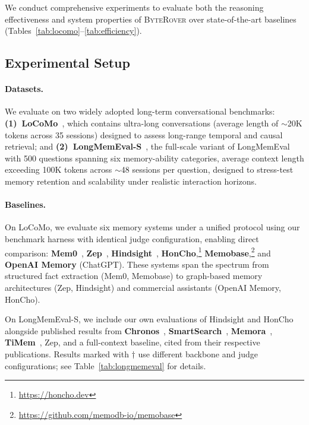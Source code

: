 \documentclass[11pt]{article}
\newcommand{\byterover}{\textsc{ByteRover}}
\begin{document}
We conduct comprehensive experiments to evaluate both the reasoning effectiveness
and system properties of \byterover{} over state-of-the-art baselines
(Tables~\ref{tab:locomo}--\ref{tab:efficiency}).

\subsection{Experimental Setup}
\label{sec:exp-setup}

\paragraph{Datasets.}
We evaluate on two widely adopted long-term conversational benchmarks:
\textbf{(1)~LoCoMo}~\citep{maharana2024locomo},
which contains ultra-long conversations (average length of $\sim$20K tokens across 35 sessions)
designed to assess long-range temporal and causal retrieval;
and \textbf{(2)~LongMemEval-S}~\citep{wu2024longmemeval},
the full-scale variant of LongMemEval with 500 questions spanning six memory-ability categories,
average context length exceeding 100K tokens across ${\sim}$48 sessions per question,
designed to stress-test memory retention and scalability under realistic interaction horizons.

\paragraph{Baselines.}
On LoCoMo, we evaluate six memory systems under a unified protocol
using our benchmark harness with identical judge configuration,
enabling direct comparison:
\textbf{Mem0}~\citep{chhikara2025mem0},
\textbf{Zep}~\citep{rasmussen2025zep},
\textbf{Hindsight}~\citep{latimer2025hindsight},
\textbf{HonCho},\footnote{\url{https://honcho.dev}}
\textbf{Memobase},\footnote{\url{https://github.com/memodb-io/memobase}}
and \textbf{OpenAI Memory} (ChatGPT).
These systems span the spectrum from structured fact extraction
(Mem0, Memobase) to graph-based memory architectures (Zep, Hindsight)
and commercial assistants (OpenAI Memory, HonCho).

On LongMemEval-S, we include our own evaluations of Hindsight and HonCho
alongside published results from
\textbf{Chronos}~\citep{sen2026chronos},
\textbf{SmartSearch}~\citep{derehag2026smartsearch},
\textbf{Memora}~\citep{xia2026memora},
\textbf{TiMem}~\citep{li2026timem},
Zep, and a full-context baseline,
cited from their respective publications.
Results marked with $\dagger$ use different backbone and judge configurations;
see Table~\ref{tab:longmemeval} for details.
\end{document}
